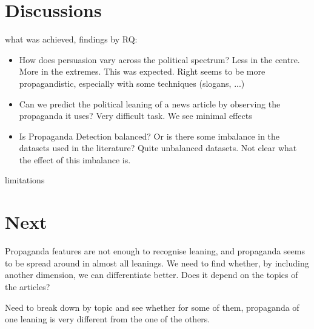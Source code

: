 \section{Discussions}
\label{sec:ps_discussions}

what was achieved, findings by RQ:

\begin{itemize}
    \item How does persuasion vary across the political spectrum? Less in the centre. More in the extremes. This was expected. Right seems to be more propagandistic, especially with some techniques (slogans, ...)
    \item Can we predict the political leaning of a news article by observing the propaganda it uses? Very difficult task. We see minimal effects
    \item Is Propaganda Detection balanced? Or is there some imbalance in the datasets used in the literature? Quite unbalanced datasets. Not clear what the effect of this imbalance is.
\end{itemize}

limitations

\section{Next}
\label{sec:ps_next}

Propaganda features are not enough to recognise leaning, and propaganda seems to be spread around in almost all leanings. We need to find whether, by including another dimension, we can differentiate better. 
Does it depend on the topics of the articles?

Need to break down by topic and see whether for some of them, propaganda of one leaning is very different from the one of the others.